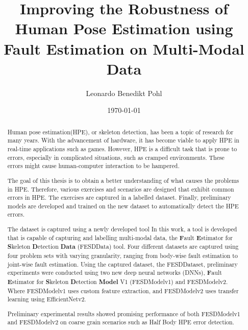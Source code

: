 
\title{Improving the Robustness of Human Pose Estimation using Fault Estimation on Multi-Modal Data}
\author{Leonardo Benedikt Pohl}
\date{\today}
 
\newlength{\originalVOffset}
\newlength{\originalHOffset}
\setlength{\originalVOffset}{\voffset}   
\setlength{\originalHOffset}{\hoffset}

\setlength{\voffset}{0cm}
\setlength{\hoffset}{0cm}

\setlength{\voffset}{\originalVOffset}
\setlength{\hoffset}{\originalHOffset}

\clearpage

\begin{abstract}
  Human pose estimation(HPE), or skeleton detection, has been a topic of research for many years. With the advancement of hardware, it has become viable to apply HPE in real-time applications such as games. However, HPE is a difficult task that is prone to errors, especially in complicated situations, such as cramped environments. These errors might cause human-computer interaction to be hampered.

  The goal of this thesis is to obtain a better understanding of what causes the problems in HPE. Therefore, various exercises and scenarios are designed that exhibit common errors in HPE. The exercises are captured in a labelled dataset. Finally, preliminary models are developed and trained on the new dataset to automatically detect the HPE errors.

  The dataset is captured using a newly developed tool In this work, a tool is developed that is capable of capturing and labelling multi-modal data, the \textbf{F}ault \textbf{E}stimator for \textbf{S}keleton \textbf{D}etection \textbf{Data} (FESDData) tool. Four different datasets are captured using four problem sets with varying granularity, ranging from body-wise fault estimation to joint-wise fault estimation. Using the captured dataset, the FESDDataset, preliminary experiments were conducted using two new deep neural networks (DNNs), \textbf{F}ault \textbf{E}stimator for \textbf{S}keleton \textbf{D}etection \textbf{Model} V1 (FESDModelv1) and FESDModelv2. Where FESDModelv1 uses custom feature extraction, and FESDModelv2 uses transfer learning using EfficientNetv2.

  Preliminary experimental results showed promising performance of both FESDModelv1 and FESDModelv2 on coarse grain scenarios such as Half Body HPE error detection.

  

\end{abstract}
